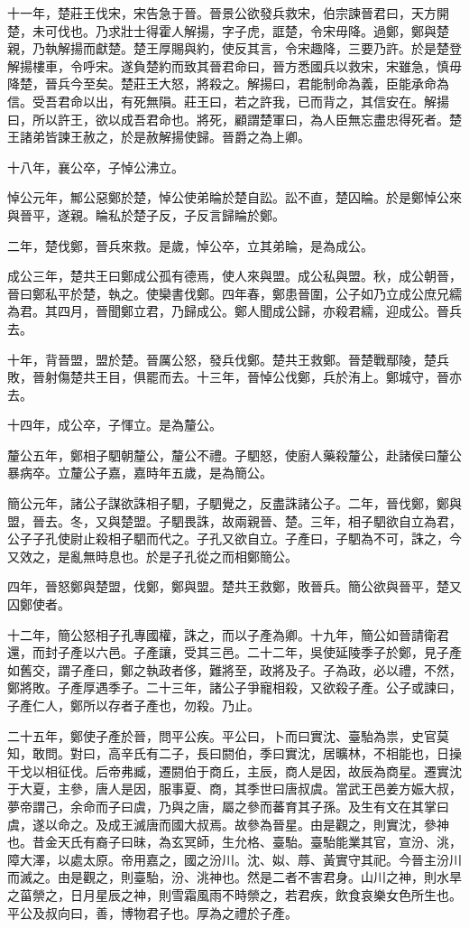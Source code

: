 十一年，楚莊王伐宋，宋告急于晉。晉景公欲發兵救宋，伯宗諫晉君曰，天方開楚，未可伐也。乃求壯士得霍人解揚，字子虎，誆楚，令宋毋降。過鄭，鄭與楚親，乃執解揚而獻楚。楚王厚賜與約，使反其言，令宋趣降，三要乃許。於是楚登解揚樓車，令呼宋。遂負楚約而致其晉君命曰，晉方悉國兵以救宋，宋雖急，慎毋降楚，晉兵今至矣。楚莊王大怒，將殺之。解揚曰，君能制命為義，臣能承命為信。受吾君命以出，有死無隕。莊王曰，若之許我，已而背之，其信安在。解揚曰，所以許王，欲以成吾君命也。將死，顧謂楚軍曰，為人臣無忘盡忠得死者。楚王諸弟皆諫王赦之，於是赦解揚使歸。晉爵之為上卿。

十八年，襄公卒，子悼公沸立。

悼公元年，鄦公惡鄭於楚，悼公使弟睔於楚自訟。訟不直，楚囚睔。於是鄭悼公來與晉平，遂親。睔私於楚子反，子反言歸睔於鄭。

二年，楚伐鄭，晉兵來救。是歲，悼公卒，立其弟睔，是為成公。

成公三年，楚共王曰鄭成公孤有德焉，使人來與盟。成公私與盟。秋，成公朝晉，晉曰鄭私平於楚，執之。使欒書伐鄭。四年春，鄭患晉圍，公子如乃立成公庶兄繻為君。其四月，晉聞鄭立君，乃歸成公。鄭人聞成公歸，亦殺君繻，迎成公。晉兵去。

十年，背晉盟，盟於楚。晉厲公怒，發兵伐鄭。楚共王救鄭。晉楚戰鄢陵，楚兵敗，晉射傷楚共王目，俱罷而去。十三年，晉悼公伐鄭，兵於洧上。鄭城守，晉亦去。

十四年，成公卒，子惲立。是為釐公。

釐公五年，鄭相子駟朝釐公，釐公不禮。子駟怒，使廚人藥殺釐公，赴諸侯曰釐公暴病卒。立釐公子嘉，嘉時年五歲，是為簡公。

簡公元年，諸公子謀欲誅相子駟，子駟覺之，反盡誅諸公子。二年，晉伐鄭，鄭與盟，晉去。冬，又與楚盟。子駟畏誅，故兩親晉、楚。三年，相子駟欲自立為君，公子子孔使尉止殺相子駟而代之。子孔又欲自立。子產曰，子駟為不可，誅之，今又效之，是亂無時息也。於是子孔從之而相鄭簡公。

四年，晉怒鄭與楚盟，伐鄭，鄭與盟。楚共王救鄭，敗晉兵。簡公欲與晉平，楚又囚鄭使者。

十二年，簡公怒相子孔專國權，誅之，而以子產為卿。十九年，簡公如晉請衛君還，而封子產以六邑。子產讓，受其三邑。二十二年，吳使延陵季子於鄭，見子產如舊交，謂子產曰，鄭之執政者侈，難將至，政將及子。子為政，必以禮，不然，鄭將敗。子產厚遇季子。二十三年，諸公子爭寵相殺，又欲殺子產。公子或諫曰，子產仁人，鄭所以存者子產也，勿殺。乃止。

二十五年，鄭使子產於晉，問平公疾。平公曰，卜而曰實沈、臺駘為祟，史官莫知，敢問。對曰，高辛氏有二子，長曰閼伯，季曰實沈，居曠林，不相能也，日操干戈以相征伐。后帝弗臧，遷閼伯于商丘，主辰，商人是因，故辰為商星。遷實沈于大夏，主參，唐人是因，服事夏、商，其季世曰唐叔虞。當武王邑姜方娠大叔，夢帝謂己，余命而子曰虞，乃與之唐，屬之參而蕃育其子孫。及生有文在其掌曰虞，遂以命之。及成王滅唐而國大叔焉。故參為晉星。由是觀之，則實沈，參神也。昔金天氏有裔子曰昧，為玄冥師，生允格、臺駘。臺駘能業其官，宣汾、洮，障大澤，以處太原。帝用嘉之，國之汾川。沈、姒、蓐、黃實守其祀。今晉主汾川而滅之。由是觀之，則臺駘，汾、洮神也。然是二者不害君身。山川之神，則水旱之菑禜之，日月星辰之神，則雪霜風雨不時禜之，若君疾，飲食哀樂女色所生也。平公及叔向曰，善，博物君子也。厚為之禮於子產。

